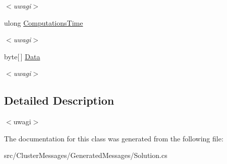\begin{DoxyCompactItemize}
\begin{DoxyCompactList}\small\item\em $<$uwagi$>$ \end{DoxyCompactList}\item 
\hypertarget{class_solutions_solution_ab7b626184f6db4321890256806f75fb5}{}ulong \hyperlink{class_solutions_solution_ab7b626184f6db4321890256806f75fb5}{Computations\+Time}\label{class_solutions_solution_ab7b626184f6db4321890256806f75fb5}

\begin{DoxyCompactList}\small\item\em $<$uwagi$>$ \end{DoxyCompactList}\item 
\hypertarget{class_solutions_solution_ab6137d1e7ecbff10aea38e1bcfe157c4}{}byte\mbox{[}$\,$\mbox{]} \hyperlink{class_solutions_solution_ab6137d1e7ecbff10aea38e1bcfe157c4}{Data}\label{class_solutions_solution_ab6137d1e7ecbff10aea38e1bcfe157c4}

\begin{DoxyCompactList}\small\item\em $<$uwagi$>$ \end{DoxyCompactList}\end{DoxyCompactItemize}


\subsection{Detailed Description}
$<$uwagi$>$ 

The documentation for this class was generated from the following file\+:\begin{DoxyCompactItemize}
\item 
src/\+Cluster\+Messages/\+Generated\+Messages/Solution.\+cs\end{DoxyCompactItemize}
